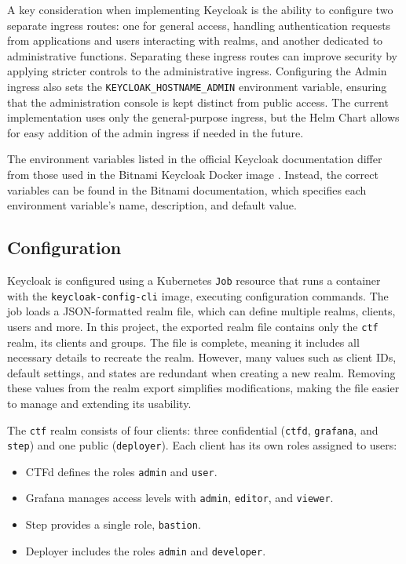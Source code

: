 A key consideration when implementing Keycloak is the ability to configure two separate ingress routes: one for general access, handling authentication requests from applications and users interacting with realms, and another dedicated to administrative functions. Separating these ingress routes can improve security by applying stricter controls to the administrative ingress. Configuring the Admin ingress also sets the \texttt{KEYCLOAK\_HOSTNAME\_ADMIN} environment variable, ensuring that the administration console is kept distinct from public access. The current implementation uses only the general-purpose ingress, but the Helm Chart allows for easy addition of the admin ingress if needed in the future.

The environment variables listed in the official Keycloak documentation differ from those used in the Bitnami Keycloak Docker image \parencite{bitnamiKeycloak}. Instead, the correct variables can be found in the Bitnami documentation, which specifies each environment variable's name, description, and default value.

\subsection{Configuration}
Keycloak is configured using a Kubernetes \texttt{Job} resource that runs a container with the \texttt{keycloak-config-cli} image, executing configuration commands. The job loads a JSON-formatted realm file, which can define multiple realms, clients, users and more. In this project, the exported realm file contains only the \texttt{ctf} realm, its clients and groups. The file is complete, meaning it includes all necessary details to recreate the realm. However, many values such as client IDs, default settings, and states are redundant when creating a new realm. Removing these values from the realm export simplifies modifications, making the file easier to manage and extending its usability.

The \texttt{ctf} realm consists of four clients: three confidential (\texttt{ctfd}, \texttt{grafana}, and \texttt{step}) and one public (\texttt{deployer}). Each client has its own roles assigned to users:

\begin{itemize} 
    \item CTFd defines the roles \texttt{admin} and \texttt{user}. 
    \item Grafana manages access levels with \texttt{admin}, \texttt{editor}, and \texttt{viewer}. 
    \item Step provides a single role, \texttt{bastion}. 
    \item Deployer includes the roles \texttt{admin} and \texttt{developer}. \end{itemize}

